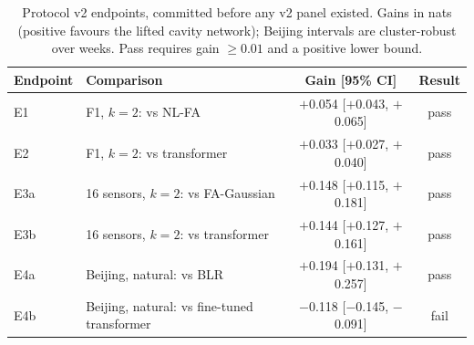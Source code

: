 \begin{table}[t]
\centering\small
\caption{\label{tab:v2}Protocol v2 endpoints, committed before any v2 panel existed. Gains in nats (positive favours the lifted cavity network); Beijing intervals are cluster-robust over weeks. Pass requires gain $\geq0.01$ and a positive lower bound.}
\begin{tabular}{llcc}
\toprule
Endpoint & Comparison & Gain [95\% CI] & Result\\
\midrule
E1 & F1, $k=2$: vs NL-FA & $+$0.054 [$+$0.043, $+$0.065] & pass\\
E2 & F1, $k=2$: vs transformer & $+$0.033 [$+$0.027, $+$0.040] & pass\\
E3a & 16 sensors, $k=2$: vs FA-Gaussian & $+$0.148 [$+$0.115, $+$0.181] & pass\\
E3b & 16 sensors, $k=2$: vs transformer & $+$0.144 [$+$0.127, $+$0.161] & pass\\
E4a & Beijing, natural: vs BLR & $+$0.194 [$+$0.131, $+$0.257] & pass\\
E4b & Beijing, natural: vs fine-tuned transformer & $-$0.118 [$-$0.145, $-$0.091] & fail\\
\bottomrule
\end{tabular}
\end{table}
